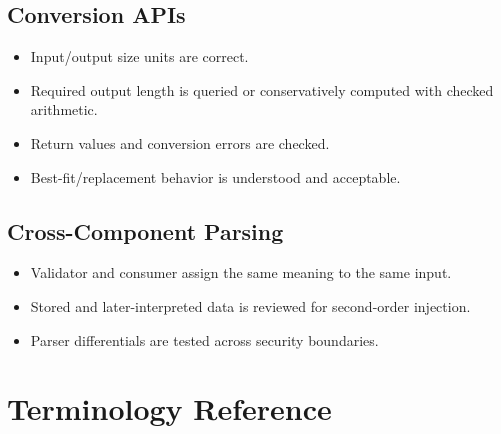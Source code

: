 \documentclass[11pt]{article}
\newcommand{\checkbox}{\(\square\)}
\begin{document}
\subsection*{Conversion APIs}
\begin{itemize}
  \item[\checkbox] Input/output size units are correct.
  \item[\checkbox] Required output length is queried or conservatively computed with checked arithmetic.
  \item[\checkbox] Return values and conversion errors are checked.
  \item[\checkbox] Best-fit/replacement behavior is understood and acceptable.
\end{itemize}

\subsection*{Cross-Component Parsing}
\begin{itemize}
  \item[\checkbox] Validator and consumer assign the same meaning to the same input.
  \item[\checkbox] Stored and later-interpreted data is reviewed for second-order injection.
  \item[\checkbox] Parser differentials are tested across security boundaries.
\end{itemize}
\clearpage
\section{Terminology Reference}
\end{document}
